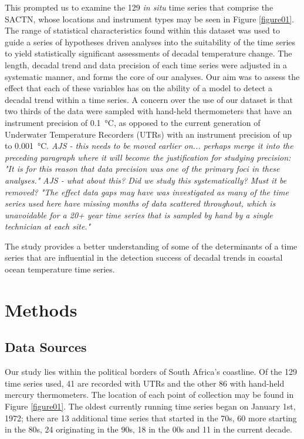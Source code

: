 \documentclass{ametsoc}
\begin{document}
This prompted us to examine the 129 \emph{in situ} time series that comprise the SACTN, whose locations and instrument types may be seen in Figure \ref{figure01}. The range of statistical characteristics found within this dataset was used to guide a series of hypotheses driven analyses into the suitability of the time series to yield statistically significant assessments of decadal temperature change. The length, decadal trend and data precision of each time series were adjusted in a systematic manner, and forms the core of our analyses. Our aim was to assess the effect that each of these variables has on the ability of a model to detect a decadal trend within a time series. A concern over the use of our dataset is that two thirds of the data were sampled with hand-held thermometers that have an instrument precision of \SI{0.1}{\degreeCelsius}, as opposed to the current generation of Underwater Temperature Recorders (UTRs) with an instrument precision of up to \SI{0.001}{\degreeCelsius}. \emph{AJS - this needs to be moved earlier on... perhaps merge it into the preceding paragraph where it will become the justification for studying precision: "It is for this reason that data precision was one of the primary foci in these analyses."} \emph{AJS - what about this? Did we study this systematically? Must it be removed? "The effect data gaps may have was investigated as many of the time series used here have missing months of data scattered throughout, which is unavoidable for a 20+ year time series that is sampled by hand by a single technician at each site."}

The study provides a better understanding of some of the determinants of a time series that are influential in the detection success of decadal trends in coastal ocean temperature time series.

\section{Methods}

\subsection{Data Sources}
Our study lies within the political borders of South Africa's coastline. Of the 129 time series used, 41 are recorded with UTRs and the other 86 with hand-held mercury thermometers. The location of each point of collection may be found in Figure \ref{figure01}. The oldest currently running time series began on January 1st, 1972; there are 13 additional time series that started in the 70s, 60 more starting in the 80s, 24 originating in the 90s, 18 in the 00s and 11 in the current decade.
\end{document}

